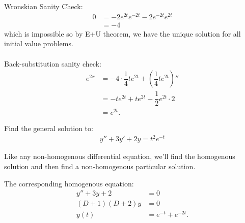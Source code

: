 \documentclass[11pt]{article}
\begin{document}
        \begin{remark}[Footnotes.]
            Wronskian Sanity Check:
            \begin{align}
                0 &= -2e^{2t}e^{-2t} - 2e^{-2t}e^{2t} \\
                &= -4
            \end{align}
            which is impossible so by E+U theorem, we have the unique solution for all initial value problems. \\~\\
            Back-substitution sanity check:
            \begin{align}
                e^{2x} &= -4 \cdot \dfrac{1}{4}te^{2t} + \left(\dfrac{1}{4}te^{2t}\right)'' \\ 
                &= -te^{2t}+te^{2t}+\dfrac{1}{2}e^{2t} \cdot 2 \\
                &= e^{2t}. 
            \end{align}
        \end{remark}
    \newpage \setcounter{equation}{-1} \begin{problem} 
        Find the general solution to:
        \begin{align}
            y'' +3y' + 2y = t^2e^{-t}
        \end{align}
    \end{problem}
        \begin{remark}[Method.]
            Like any non-homogenous differential equation, we'll find the homogenous solution and then find a non-homogenous particular solution.
        \end{remark}
        \begin{solution}[Solution 2ci]
            The corresponding homogenous equation:
            \begin{align}
                y'' + 3y + 2 &= 0 \\ 
                (D+1)(D+2)y &= 0 \\ 
                y(t) &= e^{-t} + e^{-2t}. 
            \end{align}
        \end{solution}
\end{document}
